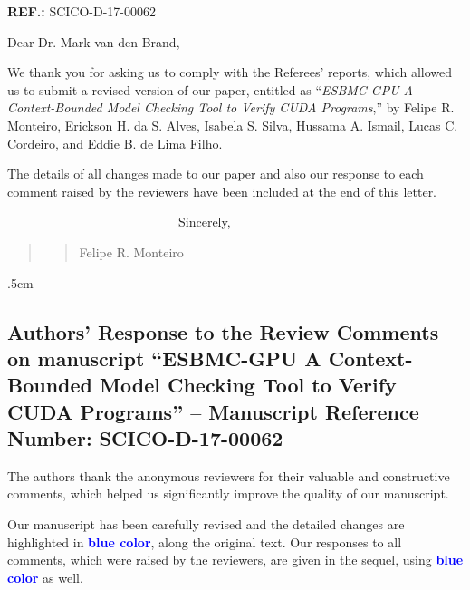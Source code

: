 \documentclass[11pt]{article}
\newcommand\vi{\vspace{\baselineskip}}
\begin{document}
\begin{flushleft}
\textbf{REF.:} SCICO-D-17-00062
    \end{flushleft}
\vi \vi
 
\indent Dear Dr. Mark van den Brand,
\vi 

We thank you for asking us to comply with the Referees' reports, which allowed us to submit a revised version of our paper, entitled as ``{\em ESBMC-GPU A Context-Bounded Model Checking Tool to Verify CUDA Programs},'' by Felipe R. Monteiro, Erickson H. da S. Alves, Isabela S. Silva, Hussama A. Ismail, Lucas C. Cordeiro, and Eddie B. de Lima Filho.


The details of all changes made to our paper and also our response to each comment raised by the reviewers have been included at the end of this letter.

\vi\vi

\indent
~~~~~~~~~~~~~~~~~~~~~~~~~~~Sincerely,\\



\begin{quote}
\begin{quote}
\begin{flushright}


\vi
\vi

Felipe R. Monteiro~~~~~~~
\end{flushright}
\end{quote}
\end{quote}

\hoffset -1.5cm \voffset .5cm


\newpage
\subsection*{Authors' Response to the Review Comments on manuscript ``{ESBMC-GPU A Context-Bounded Model Checking Tool to Verify CUDA Programs}'' -- Manuscript Reference Number: SCICO-D-17-00062}

\vi

The authors thank the anonymous reviewers for their valuable and constructive comments, which helped us significantly improve the quality of our manuscript. 

\vi

Our manuscript has been carefully revised and the detailed changes are highlighted in \textcolor{blue}{\bf blue color}, along the original text. Our responses to all comments, which were raised by the reviewers, are given in the sequel, using \textcolor{blue}{\bf blue color} as well.
\end{document}
